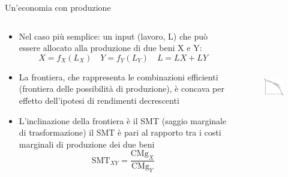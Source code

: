 \documentclass[aspectratio=64,11pt]{beamer}
\begin{document}
\begin{frame}{Un'economia con produzione}
\begin{columns}
\begin{column}{.5\columnwidth}
\begin{itemize}
\item Nel caso più semplice: un input (lavoro, L) che può essere allocato alla
produzione di due beni X e Y:
\begin{equation*}
X = f_X(L_X)\quad  Y = f_Y(L_Y)\quad L = LX + LY
\end{equation*}
\item La frontiera, che rappresenta le combinazioni efficienti (\alert{frontiera delle
possibilità di produzione}), è concava per effetto dell’ipotesi di rendimenti
decrescenti
\item L’inclinazione della frontiera è il SMT (\alert{saggio marginale di trasformazione})
il SMT è pari al rapporto tra i costi marginali di produzione dei due beni
\begin{equation*}
\text{SMT}_{XY}=\frac{\text{CMg}_X}{\text{CMg}_Y}
\end{equation*}
\end{itemize}
\end{column}


\begin{column}{.5\columnwidth}
\begin{figure}[htbp]
\centering
\includegraphics[height=5cm]{./figure/frontiere-1.pdf}
\end{figure}
\end{column}
\end{columns}
\end{frame}
\end{document}
